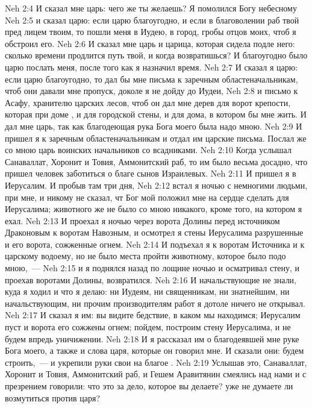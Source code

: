 \vs Neh 2:4 И сказал мне царь: чего же ты желаешь? Я помолился Богу небесному
\vs Neh 2:5 и сказал царю: если царю благоугодно, и если в благоволении раб твой пред лицем твоим, то пошли меня в Иудею, в город,  гробы отцов моих, чтоб я обстроил его.
\vs Neh 2:6 И сказал мне царь и царица, которая сидела подле него: сколько времени продлится путь твой, и когда возвратишься? И благоугодно было царю послать меня, после того как я назначил время.
\vs Neh 2:7 И сказал я царю: если царю благоугодно, то дал бы мне письма к заречным областеначальникам, чтоб они давали мне пропуск, доколе я не дойду до Иудеи,
\vs Neh 2:8 и письмо к Асафу, хранителю царских лесов, чтоб он дал мне дерев для ворот крепости, которая при доме , и для городской стены, и для дома, в котором бы мне жить. И дал мне царь, так как благодеющая рука Бога моего была надо мною.
\vs Neh 2:9 И пришел я к заречным областеначальникам и отдал им царские письма. Послал же со мною царь воинских начальников со всадниками.
\rsbpar\vs Neh 2:10 Когда услышал  Санаваллат, Хоронит и Товия, Аммонитский раб, то им было весьма досадно, что пришел человек заботиться о благе сынов Израилевых.
\rsbpar\vs Neh 2:11 И пришел я в Иерусалим. И пробыв там три дня,
\vs Neh 2:12 встал я ночью с немногими людьми,  при мне, и никому не сказал, чт Бог мой положил мне на сердце сделать для Иерусалима; животного же не было со мною никакого, кроме того, на котором я ехал.
\vs Neh 2:13 И проехал я ночью через ворота Долины перед источником Драконовым к воротам Навозным, и осмотрел я стены Иерусалима разрушенные и его ворота, сожженные огнем.
\vs Neh 2:14 И подъехал я к воротам Источника и к царскому водоему, но  не было места пройти животному, которое было подо мною,~---
\vs Neh 2:15 и я поднялся назад по лощине ночью и осматривал стену, и проехав  воротами Долины, возвратился.
\vs Neh 2:16 И начальствующие не знали, куда я ходил и что я делаю: ни Иудеям, ни священникам, ни знатнейшим, ни начальствующим, ни прочим производителям работ я дотоле ничего не открывал.
\vs Neh 2:17 И сказал я им: вы видите бедствие, в каком мы находимся; Иерусалим пуст и ворота его сожжены огнем; пойдем, построим стену Иерусалима, и не будем впредь  уничижении.
\vs Neh 2:18 И я рассказал им о благодеявшей мне руке Бога моего, а также и слова царя, которые он говорил мне. И сказали они: будем строить,~--- и укрепили руки свои на благое .
\rsbpar\vs Neh 2:19 Услышав это, Санаваллат, Хоронит и Товия, Аммонитский раб, и Гешем Аравитянин смеялись над нами и с презрением говорили: что это за дело, которое вы делаете? уже не думаете ли возмутиться против царя?
